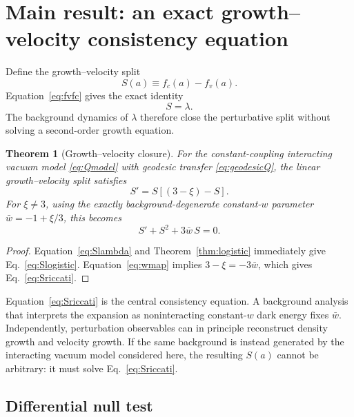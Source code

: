 \documentclass[11pt]{article}
\newtheorem{theorem}{Theorem}[section]
\theoremstyle{remark}
\begin{document}
\section{Main result: an exact growth--velocity consistency equation}
\label{sec:mainresult}

Define the growth--velocity split
\begin{equation}
    S(a)\equiv f_c(a)-f_v(a).
    \label{eq:Sdef}
\end{equation}
Equation~\eqref{eq:fvfc} gives the exact identity
\begin{equation}
    S=\lambda.
    \label{eq:Slambda}
\end{equation}
The background dynamics of $\lambda$ therefore close the perturbative split without solving a second-order growth equation.

\begin{theorem}[Growth--velocity closure]
\label{thm:growthclosure}
For the constant-coupling interacting vacuum model \eqref{eq:Qmodel} with geodesic transfer \eqref{eq:geodesicQ}, the linear growth--velocity split satisfies
\begin{equation}
    \boxed{
    S'=S\left[(3-\xi)-S\right].}
    \label{eq:Slogistic}
\end{equation}
For $\xi\neq3$, using the exactly background-degenerate constant-$w$ parameter $\bar w=-1+\xi/3$, this becomes
\begin{equation}
    \boxed{
    S'+S^2+3\bar w\,S=0.}
    \label{eq:Sriccati}
\end{equation}
\end{theorem}

\begin{proof}
Equation~\eqref{eq:Slambda} and Theorem~\ref{thm:logistic} immediately give Eq.~\eqref{eq:Slogistic}.  Equation~\eqref{eq:wmap} implies $3-\xi=-3\bar w$, which gives Eq.~\eqref{eq:Sriccati}.
\end{proof}

Equation~\eqref{eq:Sriccati} is the central consistency equation.  A background analysis that interprets the expansion as noninteracting constant-$w$ dark energy fixes $\bar w$.  Independently, perturbation observables can in principle reconstruct density growth and velocity growth.  If the same background is instead generated by the interacting vacuum model considered here, the resulting $S(a)$ cannot be arbitrary: it must solve Eq.~\eqref{eq:Sriccati}.

\subsection{Differential null test}
\end{document}
